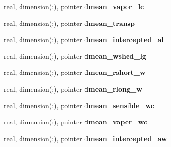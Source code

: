 \begin{DoxyCompactItemize}
\item 
\hypertarget{structed__state__vars_1_1edtype_ae5dd65bc27d6b2cc4ea78377564ab71f}{
real, dimension(:), pointer {\bfseries dmean\_\-vapor\_\-lc}}
\label{structed__state__vars_1_1edtype_ae5dd65bc27d6b2cc4ea78377564ab71f}

\item 
\hypertarget{structed__state__vars_1_1edtype_a53f259f3e86f4c01e73a116a9e9c95ca}{
real, dimension(:), pointer {\bfseries dmean\_\-transp}}
\label{structed__state__vars_1_1edtype_a53f259f3e86f4c01e73a116a9e9c95ca}

\item 
\hypertarget{structed__state__vars_1_1edtype_ab2b05cf8c1d9463649f5c35fab8554ee}{
real, dimension(:), pointer {\bfseries dmean\_\-intercepted\_\-al}}
\label{structed__state__vars_1_1edtype_ab2b05cf8c1d9463649f5c35fab8554ee}

\item 
\hypertarget{structed__state__vars_1_1edtype_a57f47bfa130bde663cf25e728e7e4246}{
real, dimension(:), pointer {\bfseries dmean\_\-wshed\_\-lg}}
\label{structed__state__vars_1_1edtype_a57f47bfa130bde663cf25e728e7e4246}

\item 
\hypertarget{structed__state__vars_1_1edtype_a4df6cc8aafb1376da269d644c65db186}{
real, dimension(:), pointer {\bfseries dmean\_\-rshort\_\-w}}
\label{structed__state__vars_1_1edtype_a4df6cc8aafb1376da269d644c65db186}

\item 
\hypertarget{structed__state__vars_1_1edtype_aecb24297f296d54c1b86a445d8a962f5}{
real, dimension(:), pointer {\bfseries dmean\_\-rlong\_\-w}}
\label{structed__state__vars_1_1edtype_aecb24297f296d54c1b86a445d8a962f5}

\item 
\hypertarget{structed__state__vars_1_1edtype_ad4eb8584d97ad7f3539bebc473b91b03}{
real, dimension(:), pointer {\bfseries dmean\_\-sensible\_\-wc}}
\label{structed__state__vars_1_1edtype_ad4eb8584d97ad7f3539bebc473b91b03}

\item 
\hypertarget{structed__state__vars_1_1edtype_a9027e4538411dbfb65d72ae6f4222f0d}{
real, dimension(:), pointer {\bfseries dmean\_\-vapor\_\-wc}}
\label{structed__state__vars_1_1edtype_a9027e4538411dbfb65d72ae6f4222f0d}

\item 
\hypertarget{structed__state__vars_1_1edtype_a54a27b0e80f9900323ed4ec1f0404940}{
real, dimension(:), pointer {\bfseries dmean\_\-intercepted\_\-aw}}
\label{structed__state__vars_1_1edtype_a54a27b0e80f9900323ed4ec1f0404940}


\end{DoxyCompactItemize}
